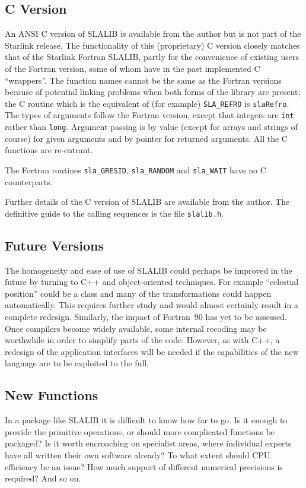 \documentclass[11pt,twoside]{article}
\begin{document}
\subsection{C Version}
An ANSI C version of SLALIB is available from the author
but is not part of the Starlink release.
The functionality of this (proprietary) C version closely matches
that of the Starlink Fortran SLALIB, partly for the convenience of
existing users of the Fortran version, some of whom have in the past
implemented C ``wrappers''.  The function names
cannot be the same as the Fortran versions because of potential
linking problems when
both forms of the library are present; the C routine which
is the equivalent of (for example) {\tt SLA\_REFRO} is {\tt slaRefro}.
The types of arguments follow the Fortran version, except
that integers are {\tt int} rather than {\tt long}.
Argument passing is by value
(except for arrays and strings of course)
for given arguments and by pointer for returned arguments.
All the C functions are re-entrant.

The Fortran routines {\tt sla\_GRESID}, {\tt sla\_RANDOM} and
{\tt sla\_WAIT} have no C counterparts.

Further details of the C version of SLALIB are available
from the author.  The definitive guide to
the calling sequences is the file {\tt slalib.h}.

\subsection{Future Versions}
The homogeneity and ease of use of SLALIB could perhaps be improved
in the future
by turning to C++ and object-oriented techniques.  For example ``celestial
position'' could be a class and many of the transformations
could happen automatically.  This requires further study and
would almost certainly result in a complete redesign.
Similarly,
the impact of Fortran~90 has yet to be assessed.  Once compilers
become widely available, some internal recoding may be worthwhile
in order to simplify parts of the code.  However, as with C++,
a redesign of the
application interfaces will be needed if the capabilities of the
new language are to be exploited to the full.

\subsection{New Functions}
In a package like SLALIB it is difficult to know how far to go.  Is it
enough to provide the primitive operations, or should more
complicated functions be packaged?  Is it worth encroaching on
specialist areas, where individual experts have all written their
own software already?  To what extent should CPU efficiency be
an issue?  How much support of different numerical precisions is
required?  And so on.
\end{document}
